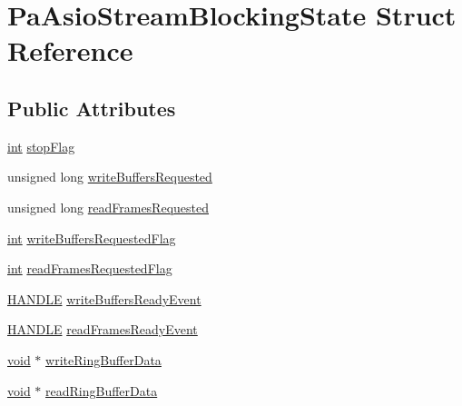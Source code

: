 \hypertarget{struct_pa_asio_stream_blocking_state}{}\section{Pa\+Asio\+Stream\+Blocking\+State Struct Reference}
\label{struct_pa_asio_stream_blocking_state}
\subsection*{Public Attributes}
\begin{DoxyCompactItemize}
\item 
\hyperlink{xmltok_8h_a5a0d4a5641ce434f1d23533f2b2e6653}{int} \hyperlink{struct_pa_asio_stream_blocking_state_ad0635a7fb4c70db4dbcc4da40301fd5f}{stop\+Flag}
\item 
unsigned long \hyperlink{struct_pa_asio_stream_blocking_state_a8fa83147d1da88898a4161f07eb8bc16}{write\+Buffers\+Requested}
\item 
unsigned long \hyperlink{struct_pa_asio_stream_blocking_state_a90210659b71bfbb266c89a834b6ce72b}{read\+Frames\+Requested}
\item 
\hyperlink{xmltok_8h_a5a0d4a5641ce434f1d23533f2b2e6653}{int} \hyperlink{struct_pa_asio_stream_blocking_state_ac41f9b20abaf565ddee10ba390f2c9e7}{write\+Buffers\+Requested\+Flag}
\item 
\hyperlink{xmltok_8h_a5a0d4a5641ce434f1d23533f2b2e6653}{int} \hyperlink{struct_pa_asio_stream_blocking_state_ac000da4cb444d7c90b6263e87566b1fb}{read\+Frames\+Requested\+Flag}
\item 
\hyperlink{_sound_touch_d_l_l_8h_aa8c0374618b33785ccb02f74bcfebc46}{H\+A\+N\+D\+LE} \hyperlink{struct_pa_asio_stream_blocking_state_a3e5e248be829e756ecbff62175f474fd}{write\+Buffers\+Ready\+Event}
\item 
\hyperlink{_sound_touch_d_l_l_8h_aa8c0374618b33785ccb02f74bcfebc46}{H\+A\+N\+D\+LE} \hyperlink{struct_pa_asio_stream_blocking_state_ab10d5241d6bc83f9ca91e8cbcff2abe6}{read\+Frames\+Ready\+Event}
\item 
\hyperlink{sound_8c_ae35f5844602719cf66324f4de2a658b3}{void} $\ast$ \hyperlink{struct_pa_asio_stream_blocking_state_af4645b9cd24335efe520d1a1894d39e6}{write\+Ring\+Buffer\+Data}
\item 
\hyperlink{sound_8c_ae35f5844602719cf66324f4de2a658b3}{void} $\ast$ \hyperlink{struct_pa_asio_stream_blocking_state_a45031877aa21279da777339eee2b1156}{read\+Ring\+Buffer\+Data}
\item 

\end{DoxyCompactItemize}
